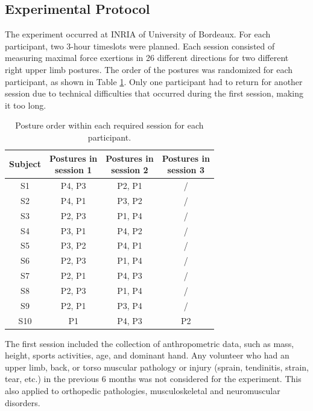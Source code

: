 \subsection{Experimental Protocol}

The experiment occurred at INRIA of University of Bordeaux. For each participant, two 3-hour timeslots were planned. Each session consisted of measuring maximal force exertions in 26 different directions for two different right upper limb postures. The order of the postures was randomized for each participant, as shown in Table \ref{tab:posture_subjects_passation}. Only one participant had to return for another session due to technical difficulties that occurred during the first session, making it too long.

\begin{table}[!ht]
    \centering
    \captionsetup{justification=centering}
    \begin{tabular}{|c|c|c|c|}
        \hline
        \textbf{Subject} & \makecell{\textbf{Postures in} \\ \textbf{session 1}} & \makecell{\textbf{Postures in} \\ \textbf{session 2}} & \makecell{\textbf{Postures in} \\ \textbf{session 3}} \\
        \hline
        S1 & P4, P3 & P2, P1 & / \\ \hline
        S2 & P4, P1 & P3, P2 & / \\ \hline
        S3 & P2, P3 & P1, P4 & / \\ \hline
        S4 & P3, P1 & P4, P2 & / \\ \hline
        S5 & P3, P2 & P4, P1 & / \\ \hline
        S6 & P2, P3 & P1, P4 & / \\ \hline
        S7 & P2, P1 & P4, P3 & / \\ \hline
        S8 & P2, P3 & P1, P4 & / \\ \hline
        S9 & P2, P1 & P3, P4 & / \\ \hline
        S10 & P1 & P4, P3 & P2 \\ \hline
    \end{tabular}
    \caption{Posture order within each required session for each participant.}
    \label{tab:posture_subjects_passation}
\end{table}

The first session included the collection of anthropometric data, such as mass, height, sports activities, age, and dominant hand. Any volunteer who had an upper limb, back, or torso muscular pathology or injury (sprain, tendinitis, strain, tear, etc.) in the previous 6 months was not considered for the experiment. This also applied to orthopedic pathologies, musculoskeletal and neuromuscular disorders.

